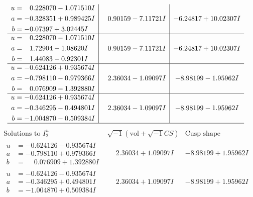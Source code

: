 \documentclass[1p]{elsarticle_modified}
\theoremstyle{definition}
\newcommand{\I}{\sqrt{-1}}
\begin{document}
$$\begin{array}{c|c|c}
\begin{aligned}
u &= \phantom{-}0.228070 - 1.071510 I \\
a &= -0.328351 + 0.989425 I \\
b &= -0.07397 + 3.02445 I\end{aligned}
 & \phantom{-}0.90159 - 7.11721 I & -6.24817 + 10.02307 I \\ \hline\begin{aligned}
u &= \phantom{-}0.228070 - 1.071510 I \\
a &= \phantom{-}1.72904 - 1.08620 I \\
b &= \phantom{-}1.44083 - 0.92301 I\end{aligned}
 & \phantom{-}0.90159 - 7.11721 I & -6.24817 + 10.02307 I \\ \hline\begin{aligned}
u &= -0.624126 + 0.935674 I \\
a &= -0.798110 - 0.979366 I \\
b &= \phantom{-}0.076909 - 1.392880 I\end{aligned}
 & \phantom{-}2.36034 - 1.09097 I & -8.98199 - 1.95962 I \\ \hline\begin{aligned}
u &= -0.624126 + 0.935674 I \\
a &= -0.346295 - 0.494801 I \\
b &= -1.004870 - 0.509384 I\end{aligned}
 & \phantom{-}2.36034 - 1.09097 I & -8.98199 - 1.95962 I\\
 \hline 
 \end{array}$$\newpage$$\begin{array}{c|c|c}  
\text{Solutions to }I^u_{2}& \I (\text{vol} + \sqrt{-1}CS) & \text{Cusp shape}\\
 \hline 
\begin{aligned}
u &= -0.624126 - 0.935674 I \\
a &= -0.798110 + 0.979366 I \\
b &= \phantom{-}0.076909 + 1.392880 I\end{aligned}
 & \phantom{-}2.36034 + 1.09097 I & -8.98199 + 1.95962 I \\ \hline\begin{aligned}
u &= -0.624126 - 0.935674 I \\
a &= -0.346295 + 0.494801 I \\
b &= -1.004870 + 0.509384 I\end{aligned}
 & \phantom{-}2.36034 + 1.09097 I & -8.98199 + 1.95962 I \\ \hline\begin{aligned}

\end{aligned}
\end{array}$$
\end{document}

